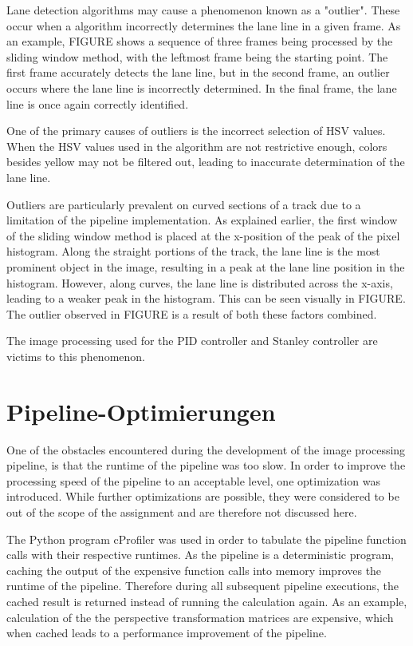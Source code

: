 \documentclass[arbeit=studie,oneside,BCOR=12mm]{ArbeitRST}
\begin{document}
\fi

Lane detection algorithms may cause a phenomenon known as a "outlier". These
occur when a algorithm incorrectly determines the lane line in a given frame.
As an example, FIGURE shows a sequence of three frames being processed by the
sliding window method, with the leftmost frame being the starting point. The
first frame accurately detects the lane line, but in the second frame, an
outlier occurs where the lane line is incorrectly determined. In the final
frame, the lane line is once again correctly identified.

One of the primary causes of outliers is the incorrect selection of HSV values.
When the HSV values used in the algorithm are not restrictive enough, colors
besides yellow may not be filtered out, leading to inaccurate determination of
the lane line.

Outliers are particularly prevalent on curved sections of a track due to a
limitation of the pipeline implementation. As explained earlier, the first
window of the sliding window method is placed at the x-position of the peak of
the pixel histogram. Along the straight portions of the track, the lane line is
the most prominent object in the image, resulting in a peak at the lane line
position in the histogram. However, along curves, the lane line is distributed
across the x-axis, leading to a weaker peak in the histogram. This can be seen
visually in FIGURE. The outlier observed in FIGURE is a result of both these
factors combined.

The image processing used for the PID controller and Stanley controller are 
victims to this phenomenon.

\section{Pipeline-Optimierungen}

One of the obstacles encountered during the development of the image processing
pipeline, is that the runtime of the pipeline was too slow. In order to improve
the processing speed of the pipeline to an acceptable level, one optimization
was introduced. While further optimizations are possible, they were considered
to be out of the scope of the assignment and are therefore not discussed here.

The Python program cProfiler was used in order to tabulate the pipeline
function calls with their respective runtimes. As the pipeline is a
deterministic program, caching the output of the expensive function calls into
memory improves the runtime of the pipeline. Therefore during all subsequent
pipeline executions, the cached result is returned instead of running the
calculation again. As an example, calculation of the the perspective
transformation matrices are expensive, which when cached leads to a performance
improvement of the pipeline.
\end{document}
